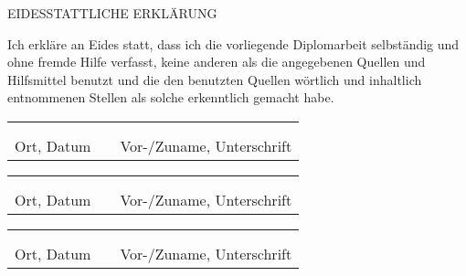 
\vspace*{2cm}

{EIDESSTATTLICHE ERKLÄRUNG\par}

\vspace*{1cm}

Ich erkläre an Eides statt, dass ich die vorliegende Diplomarbeit selbständig und ohne fremde Hilfe verfasst, keine anderen als die angegebenen Quellen und Hilfsmittel benutzt und die den benutzten Quellen wörtlich und inhaltlich entnommenen Stellen als solche erkenntlich gemacht habe. 





\vspace*{2cm}


\begin{center}
\begin{tabular}{cp{2em}c} 
   \hspace{4cm}        & & \hspace{6cm} \\\cline{1-1}\cline{3-3}
                       & & \\[-3mm]
   {\footnotesize Ort, Datum }  & & {\footnotesize Vor-/Zuname, Unterschrift }
\end{tabular}

\vspace*{1cm}

\begin{tabular}{cp{2em}c} 
   \hspace{4cm}        & & \hspace{6cm} \\\cline{1-1}\cline{3-3}
                       & & \\[-3mm]
   {\footnotesize Ort, Datum }  & & {\footnotesize Vor-/Zuname, Unterschrift }
\end{tabular}

\vspace*{1cm}

\begin{tabular}{cp{2em}c} 
   \hspace{4cm}        & & \hspace{6cm} \\\cline{1-1}\cline{3-3}
                       & & \\[-3mm]
   {\footnotesize Ort, Datum }  & & {\footnotesize Vor-/Zuname, Unterschrift }
\end{tabular}

\end{center}

\cleardoublepage

